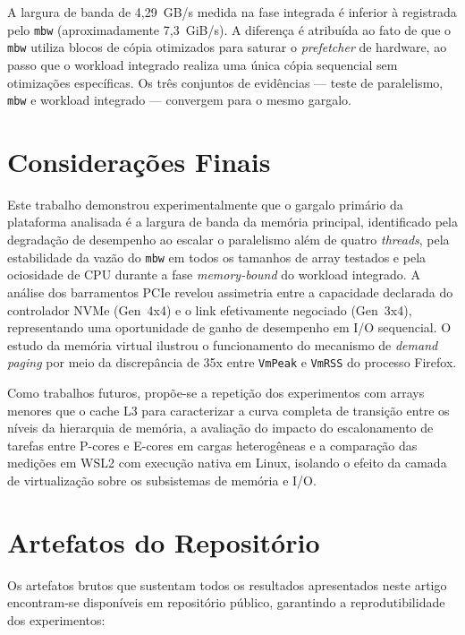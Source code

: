 \documentclass[12pt]{article}
\begin{document}
A largura de banda de 4,29~GB/s medida na fase integrada é inferior à registrada pelo \texttt{mbw} (aproximadamente 7,3~GiB/s). A diferença é atribuída ao fato de que o \texttt{mbw} utiliza blocos de cópia otimizados para saturar o \textit{prefetcher} de hardware, ao passo que o workload integrado realiza uma única cópia sequencial sem otimizações específicas. Os três conjuntos de evidências --- teste de paralelismo, \texttt{mbw} e workload integrado --- convergem para o mesmo gargalo.

\section{Considerações Finais}
\label{sec:conc}

Este trabalho demonstrou experimentalmente que o gargalo primário da plataforma analisada é a largura de banda da memória principal, identificado pela degradação de desempenho ao escalar o paralelismo além de quatro \textit{threads}, pela estabilidade da vazão do \texttt{mbw} em todos os tamanhos de array testados e pela ociosidade de CPU durante a fase \textit{memory-bound} do workload integrado. A análise dos barramentos PCIe revelou assimetria entre a capacidade declarada do controlador NVMe (Gen~4x4) e o link efetivamente negociado (Gen~3x4), representando uma oportunidade de ganho de desempenho em I/O sequencial. O estudo da memória virtual ilustrou o funcionamento do mecanismo de \textit{demand paging} por meio da discrepância de 35x entre \texttt{VmPeak} e \texttt{VmRSS} do processo Firefox.

Como trabalhos futuros, propõe-se a repetição dos experimentos com arrays menores que o cache L3 para caracterizar a curva completa de transição entre os níveis da hierarquia de memória, a avaliação do impacto do escalonamento de tarefas entre P-cores e E-cores em cargas heterogêneas e a comparação das medições em WSL2 com execução nativa em Linux, isolando o efeito da camada de virtualização sobre os subsistemas de memória e I/O.

\appendix

\section{Artefatos do Repositório}
\label{sec:anexo}

Os artefatos brutos que sustentam todos os resultados apresentados neste artigo encontram-se disponíveis em repositório público, garantindo a reprodutibilidade dos experimentos:
\end{document}
